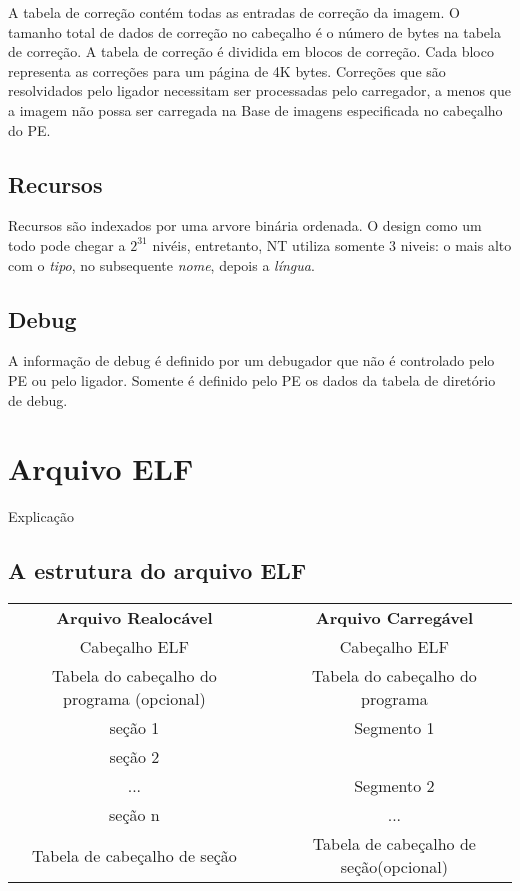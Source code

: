 A tabela de correção contém todas as entradas de correção da imagem.
O tamanho total de dados de correção no cabeçalho é o número de bytes
na tabela de correção. A tabela de correção é dividida em blocos de
correção. Cada bloco representa as correções para um página de 4K
bytes. Correções que são resolvidados pelo ligador necessitam ser
processadas pelo carregador, a menos que a imagem não possa ser carregada
na Base de imagens especificada no cabeçalho do PE.


\subsection{Recursos}


Recursos são indexados por uma arvore binária ordenada. O design
como um todo pode chegar a $2^{31}$ nivéis, entretanto, NT utiliza
somente 3 niveis: o mais alto com o \emph{tipo}, no subsequente \emph{nome},
depois a \emph{língua}.


\subsection{Debug}


A informação de debug é definido por um debugador que não é controlado
pelo PE ou pelo ligador. Somente é definido pelo PE os dados da tabela
de diretório de debug.


\section{Arquivo ELF}

Explicação


\subsection{A estrutura do arquivo ELF}

\begin{tabular}{|c|c|c|}
\multicolumn{1}{c}{\textbf{Arquivo Realocável}} & \multicolumn{1}{c}{} & \multicolumn{1}{c}{\textbf{Arquivo Carregável}}\tabularnewline
\cline{1-1} \cline{3-3} 
Cabeçalho ELF &  & Cabeçalho ELF\tabularnewline
\cline{1-1} \cline{3-3} 
Tabela do cabeçalho do programa (opcional) &  & Tabela do cabeçalho do programa\tabularnewline
\cline{1-1} \cline{3-3} 
seção 1 &  & Segmento 1\tabularnewline
\cline{1-1} 
seção 2 &  & \tabularnewline
\cline{1-1} \cline{3-3} 
... &  & Segmento 2\tabularnewline
\cline{1-1} \cline{3-3} 
seção n &  & ...\tabularnewline
\cline{1-1} \cline{3-3} 
Tabela de cabeçalho de seção &  & Tabela de cabeçalho de seção(opcional)\tabularnewline
\cline{1-1} \cline{3-3} 
\end{tabular}


